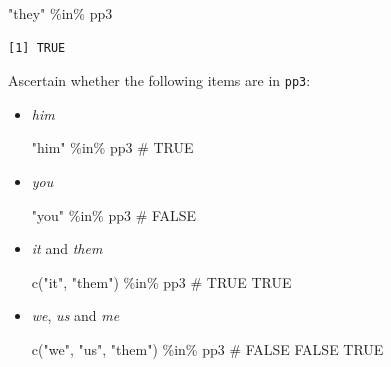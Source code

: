 \documentclass[
  11pt,
  letterpaper,
  DIV=11,
  numbers=noendperiod]{scrreprt}
\newenvironment{Shaded}{\begin{snugshade}}{\end{snugshade}}
\newcommand{\CommentTok}[1]{\textcolor[rgb]{0.37,0.37,0.37}{#1}}
\newcommand{\FunctionTok}[1]{\textcolor[rgb]{0.28,0.35,0.67}{#1}}
\newcommand{\NormalTok}[1]{\textcolor[rgb]{0.00,0.23,0.31}{#1}}
\newcommand{\SpecialCharTok}[1]{\textcolor[rgb]{0.37,0.37,0.37}{#1}}
\newcommand{\StringTok}[1]{\textcolor[rgb]{0.13,0.47,0.30}{#1}}
\begin{document}
\begin{Shaded}
\begin{Highlighting}[]
\StringTok{"they"} \SpecialCharTok{\%in\%}\NormalTok{ pp3}
\end{Highlighting}
\end{Shaded}

\begin{verbatim}
[1] TRUE
\end{verbatim}

Ascertain whether the following items are in \texttt{pp3}:

\begin{itemize}
\item
  \emph{him}

\begin{Shaded}
\begin{Highlighting}[]
\StringTok{"him"} \SpecialCharTok{\%in\%}\NormalTok{ pp3 }\CommentTok{\# TRUE}
\end{Highlighting}
\end{Shaded}
\item
  \emph{you}

\begin{Shaded}
\begin{Highlighting}[]
\StringTok{"you"} \SpecialCharTok{\%in\%}\NormalTok{ pp3 }\CommentTok{\# FALSE}
\end{Highlighting}
\end{Shaded}
\item
  \emph{it} and \emph{them}

\begin{Shaded}
\begin{Highlighting}[]
\FunctionTok{c}\NormalTok{(}\StringTok{"it"}\NormalTok{, }\StringTok{"them"}\NormalTok{) }\SpecialCharTok{\%in\%}\NormalTok{ pp3 }\CommentTok{\# TRUE TRUE}
\end{Highlighting}
\end{Shaded}
\item
  \emph{we}, \emph{us} and \emph{me}

\begin{Shaded}
\begin{Highlighting}[]
\FunctionTok{c}\NormalTok{(}\StringTok{"we"}\NormalTok{, }\StringTok{"us"}\NormalTok{, }\StringTok{"them"}\NormalTok{) }\SpecialCharTok{\%in\%}\NormalTok{ pp3 }\CommentTok{\# FALSE FALSE TRUE}
\end{Highlighting}
\end{Shaded}
\end{itemize}
\end{document}
